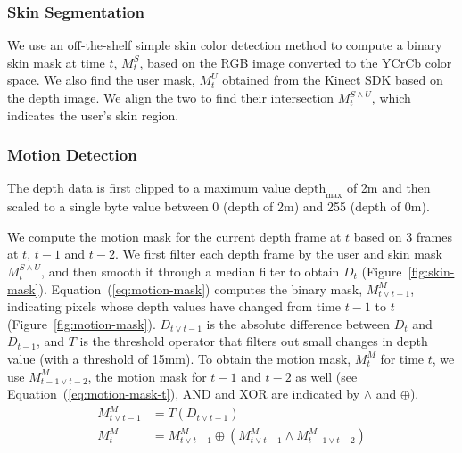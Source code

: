 \subsubsection{Skin Segmentation}
We use an off-the-shelf simple skin color detection method to compute a binary skin mask at
time $t$, $M_t^S$, based on the RGB image converted to the YCrCb color space. We
also find the user mask, $M_t^U$ obtained from the Kinect SDK based on the depth image.
We align the two to find their intersection $M_t^{S\wedge U}$, which indicates the user's skin region.

\subsubsection{Motion Detection}
The depth data is first clipped to a maximum value $\text{depth}_\text{max}$ of
2m and then scaled to a single byte value between 0 (depth of 2m) and 255
(depth of 0m).

We compute the motion mask for the current depth frame at $t$ based on 3 frames
at $t$, $t-1$ and $t-2$.
We first filter each depth frame by the user and skin mask $M_t^{S\wedge U}$, and then
smooth it through a median filter to obtain $D_t$ (Figure~\ref{fig:skin-mask}).
Equation~(\ref{eq:motion-mask}) computes the binary mask, $M_{t\vee t-1}^M$,
indicating pixels whose depth values have changed from time $t-1$ to $t$ (Figure~\ref{fig:motion-mask}).
$D_{t\vee t-1}$ is the absolute difference between $D_t$ and $D_{t-1}$, and $T$ is the threshold operator that filters out small changes in depth value
(with a threshold of 15mm).
To obtain the motion mask, $M_{t}^M$ for time $t$, we use $M_{t-1\vee t-2}^M$, the motion mask for $t-1$ and $t-2$ as well (see Equation~(\ref{eq:motion-mask-t}),
 AND and XOR are indicated by $\wedge$ and $\oplus$).
\begin{align}
M_{t\vee t-1}^M &= T(D_{t\vee t-1}) \label{eq:motion-mask} \\
M_{t}^M &= M_{t\vee t-1}^M \oplus (M_{t\vee t-1}^M \wedge M_{t-1\vee t-2}^M) \label{eq:motion-mask-t}
\end{align}


